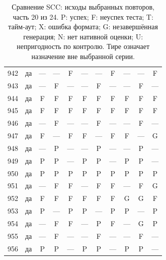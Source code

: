 \begin{table}[p]
\begin{tabular*}{\textwidth}{@{\extracolsep{\fill}}rc*{9}{c}@{}}
942 & да & — & — & F & — & — & F & — & — & F\\
943 & да & — & F & — & — & F & — & — & F & —\\
944 & да & F & F & F & F & F & F & F & F & F\\
945 & да & F & F & F & F & F & F & F & F & F\\
946 & да & — & F & — & — & F & — & — & F & —\\
947 & да & F & — & F & F & — & F & F & — & G\\
948 & да & — & P & — & — & P & — & — & P & —\\
949 & да & P & P & — & P & P & — & P & P & —\\
950 & да & P & P & P & P & P & P & P & P & P\\
951 & да & — & F & F & — & F & F & — & F & G\\
952 & да & F & F & F & F & F & F & G & G & F\\
953 & да & P & — & P & P & — & P & P & — & P\\
954 & да & — & F & F & — & P & F & — & G & P\\
955 & да & — & F & — & — & F & — & — & F & —\\
956 & да & P & P & — & P & P & — & P & P & —\\
\bottomrule\end{tabular*}
\caption{Сравнение SCC: исходы выбранных повторов, часть 20 из 24. P: успех; F: неуспех теста; T: тайм-аут; X: ошибка формата; G: незавершённая генерация; N: нет нативной оценки; U: непригодность по контролю. Тире означает назначение вне выбранной серии.}
\end{table}
\clearpage
